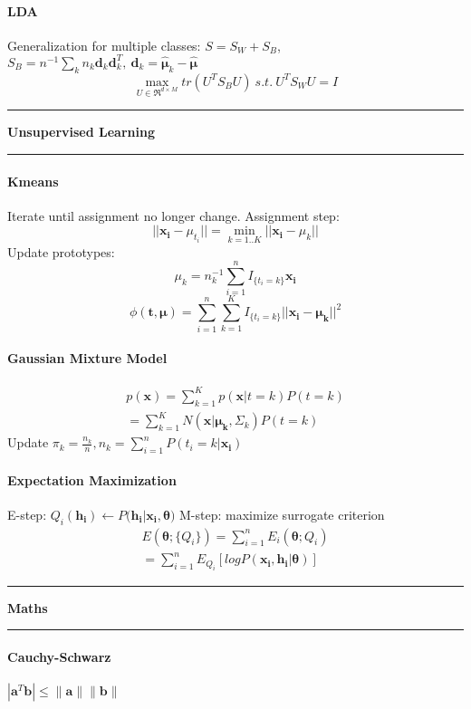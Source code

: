 \documentclass[7pt]{scrartcl}
\newlength{\secskip}
\renewcommand{\section}[1]{
  \vspace{\secskip}
  \hrule\vspace{.3em}
  \textbf{#1}
  \vspace{.3em}
  \hrule
  \vspace{\secskip}
}
\renewcommand{\vec}{\mathbf}
\begin{document}
\begin{multicols}{4}
\paragraph{LDA}
Generalization for multiple classes: $S=S_W+S_B$, $S_B = n^{-1}\sum_k n_k \vec d_k\vec d_k^T, ~ \vec d_k = \vec {\hat{\mu}}_k - \vec{ \hat{\mu}}$
\[\max_{U \in \Re^{d \times M}} tr(U^T S_B U) ~s.t.~ U^T S_WU = I\]

\section{Unsupervised Learning}
\paragraph{Kmeans}
Iterate until assignment no longer change. Assignment step: \\
\[||\vec{x_i} - \mu_{t_i}|| = \min_{k=1..K} || \vec{x_i} - \mu_{k}||\]
Update prototypes: \\
\[\mu_k = n_k^{-1} \sum_{i=1}^n I_{\{t_i=k\}}\vec{x_i}\]
\[\phi(\vec{t,\mu}) = \sum_{i=1}^n\sum_{k=1}^K I_{\{t_i=k\}} || \vec{x_i} - \vec{\mu_k} || ^2\]
\paragraph{Gaussian Mixture Model}
\begin{align*}
p(\vec{x}) = \sum_{k=1}^K p(\vec{x}|t=k) P(t=k) \\
=  \sum_{k=1}^K N(\vec{x}|\vec{\mu_k},\Sigma_k)P(t=k)
\end{align*}
Update $\pi_k = \frac{n_k}{n}, n_k = \sum_{i=1}^nP(t_i=k|\vec{x_i})$

\paragraph{Expectation Maximization}
E-step: $Q_i(\vec{h_i}) \leftarrow P(\vec{h_i}|\vec{x_i},\vec{\theta)}$
M-step: maximize surrogate criterion
\begin{align*}
E(\vec{\theta};\{Q_i\}) = \sum_{i=1}^n E_i(\vec{\theta};Q_i) \\= \sum_{i=1}^n E_{Q_i} [logP(\vec{x_i},\vec{h_i}|\vec{\theta})]
\end{align*}

\section{Maths} 
\paragraph{Cauchy-Schwarz}
 $|\vec a ^T \vec b|\leq \| \vec a \| \| \vec b \|$

\end{multicols}
\end{document}
